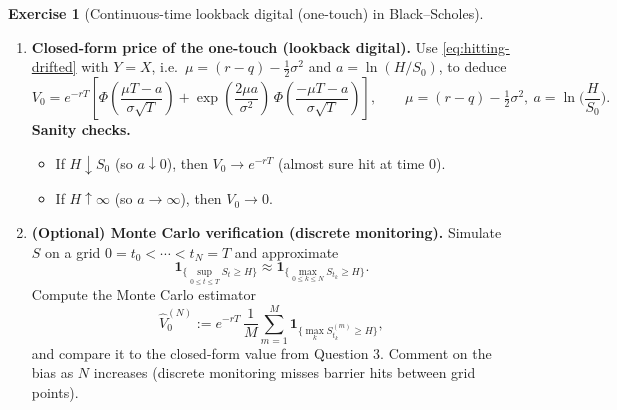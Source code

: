 \documentclass[11pt]{article}
\newcommand{\E}{\mathbb{E}}
\newcommand{\F}{\mathcal{F}}
\newcommand{\1}{\mathbf{1}}
\newcommand{\dd}{\,\mathrm{d}}
\theoremstyle{definition}
\newtheorem{exercise}{Exercise}[section]
\begin{document}
\begin{exercise}[Continuous-time lookback digital (one-touch) in Black--Scholes]
\begin{enumerate}[leftmargin=1.6em, itemsep=0.35em]
\medskip
\noindent\textbf{Guided proof (recommended).}
\begin{enumerate}[leftmargin=1.6em, itemsep=0.25em]
\item First treat the driftless case $\mu=0$:
show that
\[
\mathbb{Q}\!\left(\sup_{0\le t\le T} (\sigma B_t)\ge a\right)
=
2\,\mathbb{Q}(\sigma B_T \ge a)
=
2\left[1-\Phi\!\left(\frac{a}{\sigma\sqrt{T}}\right)\right].
\]
Hint: use the reflection principle for Brownian motion.

\item Now handle $\mu\neq 0$ using a \emph{change of measure}.
Define $\theta:=\mu/\sigma$ and the density
\[
Z_T:=\exp\!\left(-\theta B_T - \tfrac12\theta^2 T\right).
\]
Under the tilted measure $\widetilde{\mathbb{Q}}$ defined by
$\dd\widetilde{\mathbb{Q}}=Z_T\,\dd\mathbb{Q}$ on $\F_T$,
the process $\widetilde B_t:=B_t+\theta t$ is a Brownian motion.
Rewrite $Y_t$ under $\widetilde{\mathbb{Q}}$ in terms of $\widetilde B$ and reduce the problem to
a driftless maximum event under $\widetilde{\mathbb{Q}}$.

\item Carefully transform back to $\mathbb{Q}$ (use $\E^{\mathbb{Q}}[\cdot]=\E^{\widetilde{\mathbb{Q}}}[Z_T^{-1}\cdot]$)
and simplify to obtain \eqref{eq:hitting-drifted}.
\end{enumerate}

\item \textbf{Closed-form price of the one-touch (lookback digital).}
Use \eqref{eq:hitting-drifted} with $Y=X$, i.e.\ $\mu=(r-q)-\tfrac12\sigma^2$ and $a=\ln(H/S_0)$, to deduce
\[
V_0
=
e^{-rT}\left[
\Phi\!\left(\frac{\mu T-a}{\sigma\sqrt{T}}\right)
+
\exp\!\left(\frac{2\mu a}{\sigma^2}\right)\,
\Phi\!\left(\frac{-\mu T-a}{\sigma\sqrt{T}}\right)
\right],
\qquad
\mu=(r-q)-\tfrac12\sigma^2,\ a=\ln\!\Big(\frac{H}{S_0}\Big).
\]
\textbf{Sanity checks.}
\begin{itemize}[leftmargin=1.6em, itemsep=0.2em]
\item If $H\downarrow S_0$ (so $a\downarrow0$), then $V_0\to e^{-rT}$ (almost sure hit at time 0).
\item If $H\uparrow\infty$ (so $a\to\infty$), then $V_0\to 0$.
\end{itemize}

\item \textbf{(Optional) Monte Carlo verification (discrete monitoring).}
Simulate $S$ on a grid $0=t_0<\cdots<t_N=T$ and approximate
\[
\mathbf 1_{\{\sup_{0\le t\le T} S_t\ge H\}}
\approx
\mathbf 1_{\{\max_{0\le k\le N} S_{t_k}\ge H\}}.
\]
Compute the Monte Carlo estimator
\[
\widehat V_0^{(N)} := e^{-rT}\,\frac1M\sum_{m=1}^M
\mathbf 1_{\{\max_k S_{t_k}^{(m)}\ge H\}},
\]
and compare it to the closed-form value from Question 3.
Comment on the bias as $N$ increases (discrete monitoring misses barrier hits between grid points).

\end{enumerate}

\end{exercise}
\end{document}
